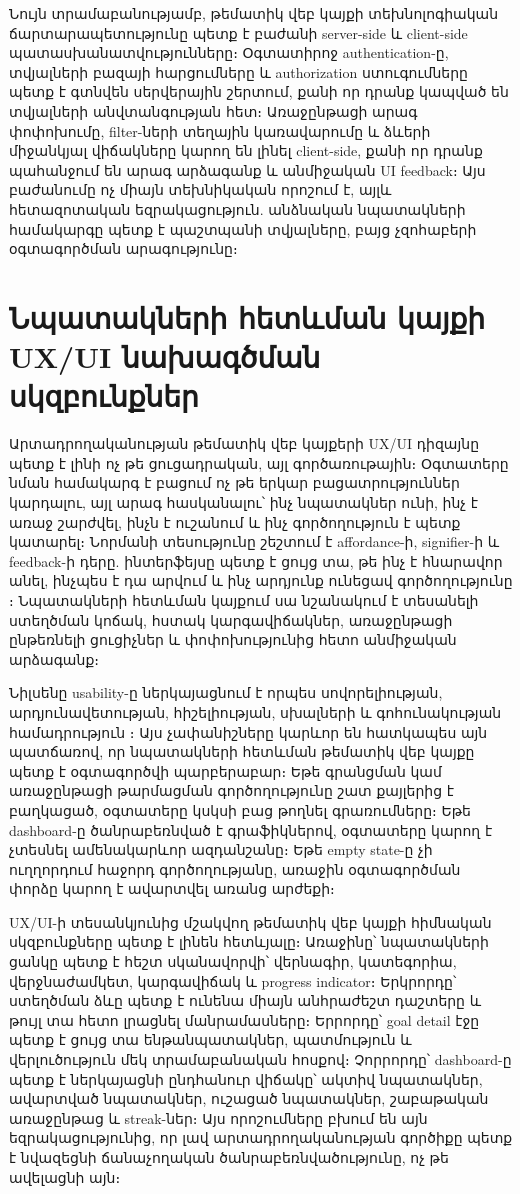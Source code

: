 Նույն տրամաբանությամբ, թեմատիկ վեբ կայքի տեխնոլոգիական ճարտարապետությունը պետք է բաժանի server-side և client-side պատասխանատվությունները։ Օգտատիրոջ authentication-ը, տվյալների բազայի հարցումները և authorization ստուգումները պետք է գտնվեն սերվերային շերտում, քանի որ դրանք կապված են տվյալների անվտանգության հետ։ Առաջընթացի արագ փոփոխումը, filter-ների տեղային կառավարումը և ձևերի միջանկյալ վիճակները կարող են լինել client-side, քանի որ դրանք պահանջում են արագ արձագանք և անմիջական UI feedback։ Այս բաժանումը ոչ միայն տեխնիկական որոշում է, այլև հետազոտական եզրակացություն. անձնական նպատակների համակարգը պետք է պաշտպանի տվյալները, բայց չզոհաբերի օգտագործման արագությունը։

\section{Նպատակների հետևման կայքի UX/UI նախագծման սկզբունքներ}

Արտադրողականության թեմատիկ վեբ կայքերի UX/UI դիզայնը պետք է լինի ոչ թե ցուցադրական, այլ գործառութային։ Օգտատերը նման համակարգ է բացում ոչ թե երկար բացատրություններ կարդալու, այլ արագ հասկանալու՝ ինչ նպատակներ ունի, ինչ է առաջ շարժվել, ինչն է ուշանում և ինչ գործողություն է պետք կատարել։ Նորմանի տեսությունը շեշտում է affordance-ի, signifier-ի և feedback-ի դերը. ինտերֆեյսը պետք է ցույց տա, թե ինչ է հնարավոր անել, ինչպես է դա արվում և ինչ արդյունք ունեցավ գործողությունը \autocite{norman2013design}։ Նպատակների հետևման կայքում սա նշանակում է տեսանելի ստեղծման կոճակ, հստակ կարգավիճակներ, առաջընթացի ընթեռնելի ցուցիչներ և փոփոխությունից հետո անմիջական արձագանք։

Նիլսենը usability-ը ներկայացնում է որպես սովորելիության, արդյունավետության, հիշելիության, սխալների և գոհունակության համադրություն \autocite{nielsen2012usability}։ Այս չափանիշները կարևոր են հատկապես այն պատճառով, որ նպատակների հետևման թեմատիկ վեբ կայքը պետք է օգտագործվի պարբերաբար։ Եթե գրանցման կամ առաջընթացի թարմացման գործողությունը շատ քայլերից է բաղկացած, օգտատերը կսկսի բաց թողնել գրառումները։ Եթե dashboard-ը ծանրաբեռնված է գրաֆիկներով, օգտատերը կարող է չտեսնել ամենակարևոր ազդանշանը։ Եթե empty state-ը չի ուղղորդում հաջորդ գործողությանը, առաջին օգտագործման փորձը կարող է ավարտվել առանց արժեքի։

UX/UI-ի տեսանկյունից մշակվող թեմատիկ վեբ կայքի հիմնական սկզբունքները պետք է լինեն հետևյալը։ Առաջինը՝ նպատակների ցանկը պետք է հեշտ սկանավորվի՝ վերնագիր, կատեգորիա, վերջնաժամկետ, կարգավիճակ և progress indicator։ Երկրորդը՝ ստեղծման ձևը պետք է ունենա միայն անհրաժեշտ դաշտերը և թույլ տա հետո լրացնել մանրամասները։ Երրորդը՝ goal detail էջը պետք է ցույց տա ենթանպատակներ, պատմություն և վերլուծություն մեկ տրամաբանական հոսքով։ Չորրորդը՝ dashboard-ը պետք է ներկայացնի ընդհանուր վիճակը՝ ակտիվ նպատակներ, ավարտված նպատակներ, ուշացած նպատակներ, շաբաթական առաջընթաց և streak-ներ։ Այս որոշումները բխում են այն եզրակացությունից, որ լավ արտադրողականության գործիքը պետք է նվազեցնի ճանաչողական ծանրաբեռնվածությունը, ոչ թե ավելացնի այն։

